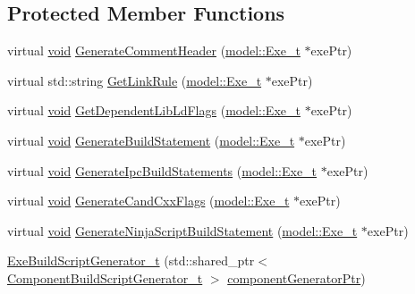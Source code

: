 \subsection*{Protected Member Functions}
\begin{DoxyCompactItemize}
\item 
virtual \hyperlink{_t_e_m_p_l_a_t_e__cdef_8h_ac9c84fa68bbad002983e35ce3663c686}{void} \hyperlink{classninja_1_1_exe_build_script_generator__t_ad4b102ce4bea192250b076337ffd0511}{Generate\+Comment\+Header} (\hyperlink{structmodel_1_1_exe__t}{model\+::\+Exe\+\_\+t} $\ast$exe\+Ptr)
\item 
virtual std\+::string \hyperlink{classninja_1_1_exe_build_script_generator__t_a626a2f5c563934afcc5f93e16e6e2890}{Get\+Link\+Rule} (\hyperlink{structmodel_1_1_exe__t}{model\+::\+Exe\+\_\+t} $\ast$exe\+Ptr)
\item 
virtual \hyperlink{_t_e_m_p_l_a_t_e__cdef_8h_ac9c84fa68bbad002983e35ce3663c686}{void} \hyperlink{classninja_1_1_exe_build_script_generator__t_a17a0067500a9e28db70e02daac18fd24}{Get\+Dependent\+Lib\+Ld\+Flags} (\hyperlink{structmodel_1_1_exe__t}{model\+::\+Exe\+\_\+t} $\ast$exe\+Ptr)
\item 
virtual \hyperlink{_t_e_m_p_l_a_t_e__cdef_8h_ac9c84fa68bbad002983e35ce3663c686}{void} \hyperlink{classninja_1_1_exe_build_script_generator__t_ac6659c63a00b8a8e30783bcc5398763c}{Generate\+Build\+Statement} (\hyperlink{structmodel_1_1_exe__t}{model\+::\+Exe\+\_\+t} $\ast$exe\+Ptr)
\item 
virtual \hyperlink{_t_e_m_p_l_a_t_e__cdef_8h_ac9c84fa68bbad002983e35ce3663c686}{void} \hyperlink{classninja_1_1_exe_build_script_generator__t_a0305b9a18e6e76965a7fffb0fb0da235}{Generate\+Ipc\+Build\+Statements} (\hyperlink{structmodel_1_1_exe__t}{model\+::\+Exe\+\_\+t} $\ast$exe\+Ptr)
\item 
virtual \hyperlink{_t_e_m_p_l_a_t_e__cdef_8h_ac9c84fa68bbad002983e35ce3663c686}{void} \hyperlink{classninja_1_1_exe_build_script_generator__t_a2b4b35a369a2d6694caf676955e4100a}{Generate\+Cand\+Cxx\+Flags} (\hyperlink{structmodel_1_1_exe__t}{model\+::\+Exe\+\_\+t} $\ast$exe\+Ptr)
\item 
virtual \hyperlink{_t_e_m_p_l_a_t_e__cdef_8h_ac9c84fa68bbad002983e35ce3663c686}{void} \hyperlink{classninja_1_1_exe_build_script_generator__t_ae54551224a8aeb220e7acc099fe24e81}{Generate\+Ninja\+Script\+Build\+Statement} (\hyperlink{structmodel_1_1_exe__t}{model\+::\+Exe\+\_\+t} $\ast$exe\+Ptr)
\item 
\hyperlink{classninja_1_1_exe_build_script_generator__t_ad39632f4c11b3acd7a2ae227cab5ee54}{Exe\+Build\+Script\+Generator\+\_\+t} (std\+::shared\+\_\+ptr$<$ \hyperlink{classninja_1_1_component_build_script_generator__t}{Component\+Build\+Script\+Generator\+\_\+t} $>$ \hyperlink{structninja_1_1_require_component_generator__t_a2d8fad572d5c50950a3daf34894b4baa}{component\+Generator\+Ptr})
\end{DoxyCompactItemize}
